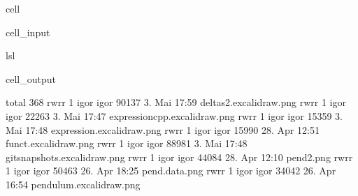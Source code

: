 \documentclass[a4paper,10pt,english]{jupyterBook}
\begin{document}
\begin{sphinxuseclass}{cell}\begin{sphinxVerbatimInput}

\begin{sphinxuseclass}{cell_input}
\begin{sphinxVerbatim}[commandchars=\\\{\}]
ls\PYGZhy{}l
\end{sphinxVerbatim}

\end{sphinxuseclass}\end{sphinxVerbatimInput}
\begin{sphinxVerbatimOutput}

\begin{sphinxuseclass}{cell_output}
\begin{sphinxVerbatim}[commandchars=\\\{\}]
total 368
\PYGZhy{}rw\PYGZhy{}r\PYGZhy{}\PYGZhy{}r\PYGZhy{}\PYGZhy{} 1 igor igor 90137  3. Mai 17:59 deltas2.excalidraw.png
\PYGZhy{}rw\PYGZhy{}r\PYGZhy{}\PYGZhy{}r\PYGZhy{}\PYGZhy{} 1 igor igor 22263  3. Mai 17:47 expression\PYGZus{}cpp.excalidraw.png
\PYGZhy{}rw\PYGZhy{}r\PYGZhy{}\PYGZhy{}r\PYGZhy{}\PYGZhy{} 1 igor igor 15359  3. Mai 17:48 expression.excalidraw.png
\PYGZhy{}rw\PYGZhy{}r\PYGZhy{}\PYGZhy{}r\PYGZhy{}\PYGZhy{} 1 igor igor 15990 28. Apr 12:51 funct.excalidraw.png
\PYGZhy{}rw\PYGZhy{}r\PYGZhy{}\PYGZhy{}r\PYGZhy{}\PYGZhy{} 1 igor igor 88981  3. Mai 17:48 gitsnapshots.excalidraw.png
\PYGZhy{}rw\PYGZhy{}r\PYGZhy{}\PYGZhy{}r\PYGZhy{}\PYGZhy{} 1 igor igor 44084 28. Apr 12:10 pend2.png
\PYGZhy{}rw\PYGZhy{}r\PYGZhy{}\PYGZhy{}r\PYGZhy{}\PYGZhy{} 1 igor igor 50463 26. Apr 18:25 pend.data.png
\PYGZhy{}rw\PYGZhy{}r\PYGZhy{}\PYGZhy{}r\PYGZhy{}\PYGZhy{} 1 igor igor 34042 26. Apr 16:54 pendulum.excalidraw.png
\end{sphinxVerbatim}

\end{sphinxuseclass}\end{sphinxVerbatimOutput}

\end{sphinxuseclass}
\end{document}
